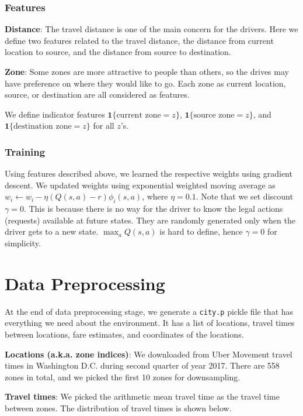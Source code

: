 \documentclass{article}
\begin{document}
\subsubsection{Features}
\noindent\textbf{Distance}:
The travel distance is one of the main concern for the drivers. Here we define two features related to the travel distance, the distance from current location to source, and the distance from source to destination.

\noindent\textbf{Zone}: Some zones are more attractive to people than others, so the drives may have preference on where they would like to go. Each zone as current location, source, or destination are all considered as features.

We define indicator features $\bm{1}\{\text{current zone}=z\}$, $\bm{1}\{\text{source zone}=z\}$, and $\bm{1}\{\text{destination zone}=z\}$ for all $z$'s.

\subsubsection{Training}

Using features described above, we learned the respective weights using gradient descent. We updated weights using exponential weighted moving average as $w_{i}\leftarrow w_{i}-\eta(Q(s,a)-r)\phi_{i}(s,a)$, where $\eta=0.1$. Note that we set discount $\gamma=0$. This is because there is no way for the driver to know the legal actions (requests) available at future states. They are randomly generated only when the driver gets to a new state. $\max_{a}Q(s,a)$ is hard to define, hence $\gamma=0$ for simplicity.

\section{Data Preprocessing}

At the end of data preprocessing stage, we generate a \texttt{city.p} pickle file that has everything we need about the environment. It has a list of locations, travel times between locations, fare estimates, and coordinates of the locations.

\noindent\textbf{Locations (a.k.a. zone indices)}: We downloaded from Uber Movement travel times in Washington D.C. during second quarter of year 2017. There are 558 zones in total, and we picked the first 10 zones for downsampling.

\noindent\textbf{Travel times}: We picked the arithmetic mean travel time as the travel time between zones. The distribution of travel times is shown below.
\end{document}
